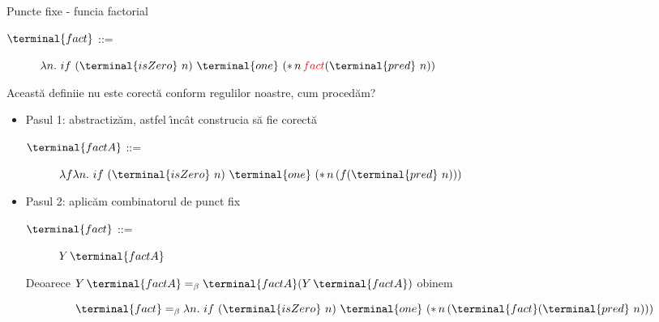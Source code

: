 \documentclass[xcolor=pdftex,romanian,colorlinks]{beamer}
\begin{document}
\begin{frame}[fragile]{Puncte fixe - func\ts ia factorial}

  \begin{description}
    \item[$\terminal{fact}$ ::=] $\lambda n. \,\,if\,\, (\terminal{isZero}\,\, n)\,\, \terminal{one}\,\, (*\, n\, {\textcolor{red}{fact}} (\terminal{pred} \,\,n))$
    \end{description}
    \pause\medskip
Aceast\u a defini\ts ie nu este corect\u a conform regulilor noastre, cum proced\u am?\pause\medskip
\begin{itemize}
\item Pasul 1: abstractiz\u am, astfel \^{\i}nc\^ at construc\ts ia s\u a fie corect\u a

\begin{description}
    \item[$\terminal{factA}$ ::=] $\lambda f\lambda n. \,\,if\,\, (\terminal{isZero}\,\, n)\,\, \terminal{one}\,\, (*\, n\, ( f (\terminal{pred} \,\,n)))$
    \end{description}
\pause
\item Pasul 2: aplic\u am combinatorul de punct fix

\begin{description}
    \item[$\terminal{fact}$ ::=] $ Y \, \terminal{factA}$
    \end{description}
    \pause
    
Deoarece $Y\,\terminal{factA} =_\beta \terminal{factA}(Y\,\terminal{factA})$ ob\ts inem 

   $$\terminal{fact} =_\beta \lambda n. \,\,if\,\, (\terminal{isZero}\,\, n)\,\, \terminal{one}\,\, (*\, n\, (\terminal{fact} (\terminal{pred} \,\,n)))$$ 
\end{itemize}    
\end{frame}
\end{document}
